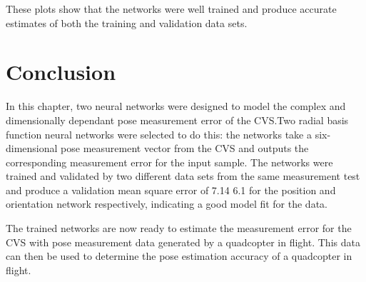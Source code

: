These plots show that the networks were well trained and produce accurate estimates of both the training and validation data sets. 
\section{Conclusion}

In this chapter, two neural networks were designed to model the complex and dimensionally dependant pose measurement error of the CVS.\@ Two radial basis function neural networks were selected to do this: the networks take a six-dimensional pose measurement vector from the CVS and outputs the corresponding measurement error for the input sample. The networks were trained and validated by two different data sets from the same measurement test and produce a validation mean square error of 7.14 6.1 for the position and orientation network respectively, indicating a good model fit for the data. 

The trained networks are now ready to estimate the measurement error for the CVS with pose measurement data generated by a quadcopter in flight. This data can then be used to determine the pose estimation accuracy of a quadcopter in flight. 
